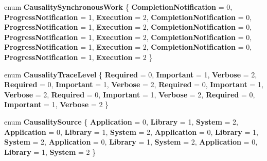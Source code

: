 \begin{DoxyCompactItemize}
enum {\bfseries Causality\+Synchronous\+Work} \{ \newline
{\bfseries Completion\+Notification} = 0, 
{\bfseries Progress\+Notification} = 1, 
{\bfseries Execution} = 2, 
{\bfseries Completion\+Notification} = 0, 
\newline
{\bfseries Progress\+Notification} = 1, 
{\bfseries Execution} = 2, 
{\bfseries Completion\+Notification} = 0, 
{\bfseries Progress\+Notification} = 1, 
\newline
{\bfseries Execution} = 2, 
{\bfseries Completion\+Notification} = 0, 
{\bfseries Progress\+Notification} = 1, 
{\bfseries Execution} = 2, 
\newline
{\bfseries Completion\+Notification} = 0, 
{\bfseries Progress\+Notification} = 1, 
{\bfseries Execution} = 2
 \}
\item 
\mbox{\label{namespace_windows_1_1_foundation_1_1_diagnostics_aa82022f66e6c5b053464b95c6479f156}} 
enum {\bfseries Causality\+Trace\+Level} \{ \newline
{\bfseries Required} = 0, 
{\bfseries Important} = 1, 
{\bfseries Verbose} = 2, 
{\bfseries Required} = 0, 
\newline
{\bfseries Important} = 1, 
{\bfseries Verbose} = 2, 
{\bfseries Required} = 0, 
{\bfseries Important} = 1, 
\newline
{\bfseries Verbose} = 2, 
{\bfseries Required} = 0, 
{\bfseries Important} = 1, 
{\bfseries Verbose} = 2, 
\newline
{\bfseries Required} = 0, 
{\bfseries Important} = 1, 
{\bfseries Verbose} = 2
 \}
\item 
\mbox{\label{namespace_windows_1_1_foundation_1_1_diagnostics_a3a370b356cb758e027ffea6414919c72}} 
enum {\bfseries Causality\+Source} \{ \newline
{\bfseries Application} = 0, 
{\bfseries Library} = 1, 
{\bfseries System} = 2, 
{\bfseries Application} = 0, 
\newline
{\bfseries Library} = 1, 
{\bfseries System} = 2, 
{\bfseries Application} = 0, 
{\bfseries Library} = 1, 
\newline
{\bfseries System} = 2, 
{\bfseries Application} = 0, 
{\bfseries Library} = 1, 
{\bfseries System} = 2, 
\newline
{\bfseries Application} = 0, 
{\bfseries Library} = 1, 
{\bfseries System} = 2
 \}
\item 

\end{DoxyCompactItemize}
